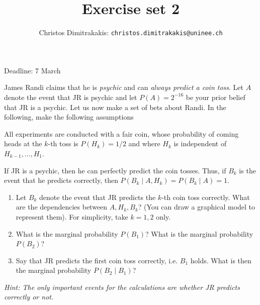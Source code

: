 \documentclass[twoside,a4paper]{article}
\begin{document}
\title{Exercise set 2}
\author{Christos Dimitrakakis: \texttt{christos.dimitrakakis@uninee.ch}}

\maketitle
\large{Deadline: 7 March}

\vspace{1em}

\begin{exercise}
  James Randi claims that he is \emph{psychic} and can \emph{always predict a coin toss}. Let $A$ denote the event that JR is psychic and let $P(A) = 2^{-16}$ be your prior belief that JR is a psychic. Let us now make a set of bets about Randi.
  In the following, make the following assumptions
  \begin{assumption}
    All experiments are conducted with a fair coin, whose probability of coming heads at the $k$-th toss is $P(H_k) = 1/2$ and where $H_k$ is independent of $H_{k-1}, \ldots, H_1$.
  \end{assumption}
  \begin{assumption}
    If JR is a psychic, then he can perfectly predict the coin tosses. Thus, if $B_k$ is the event that he predicts correctly, then $P(B_k \mid A, H_k) = P(B_k \mid A) = 1$.
  \end{assumption}


  
  \begin{enumerate}
  \item Let $B_k$ denote the event that JR predicts the $k$-th coin toss correctly. What are the dependencies between $A, H_k, B_k$? (You can draw a graphical model to represent them). For simplicity, take $k=1, 2$ only.
  \item What is the marginal probability $P(B_1)$? What is the marginal probability $P(B_2)$?  
  \item Say that JR predicts the first coin toss correctly, i.e. $B_1$ holds. What is then the marginal probability $P(B_2 \mid B_1)$? 
  \end{enumerate}
  \emph{Hint: The only important events for the calculations are whether JR predicts correctly or not.}
\end{exercise}
\end{document}
